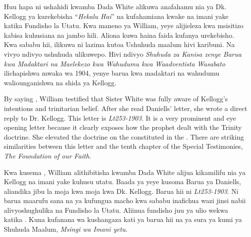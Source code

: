 Huu hapa ni ushahidi kwamba Dada White alikuwa anafahamu nia ya Dk. Kellogg ya kurekebisha “\textit{Hekalu Hai}” na kufahamiana kwake na imani yake katika Fundisho la Utatu. Kwa maneno ya William, yeye alijieleza kwa msisitizo kabisa kuhusiana na jambo hili. Aliona kuwa haina faida kufanya urekebisho. Kwa sababu hii, ilikuwa ni lazima kutoa Ushuhuda maalum hivi karibuni. Na vivyo ndivyo ushuhuda ulikuwepo. Hivi ndivyo \textit{Shuhuda za Kanisa zenye Barua kwa Madaktari na Maelekezo kwa Wahudumu kwa Waadventista Wasabato} ilichapishwa mwaka wa 1904, yenye barua kwa madaktari na wahudumu waliounganishwa na shida ya Kellogg.


By saying , William testified that Sister White was fully aware of Kellogg's intentions and trinitarian belief. After she read Daniells’ letter, she wrote a direct reply to Dr. Kellogg. This letter is \textit{Lt253-1903}. It is a very prominent and eye opening letter because it clearly exposes how the prophet dealt with the Trinity doctrine. She elevated the doctrine on the  constituted in the . There are striking similarities between this letter and the tenth chapter of the Special Testimonies, \textit{The Foundation of our Faith}.


Kwa kusema , William alithibitisha kwamba Dada White alijua kikamilifu nia ya Kellogg na imani yake kuhusu utatu. Baada ya yeye kusoma Barua ya Daniells, aliandika jibu la moja kwa moja kwa Dk. Kellogg. Barua hii ni \textit{Lt253-1903}. Ni barua maarufu sana na ya kufungua macho kwa sababu inafichua wazi jinsi nabii alivyoshughulika na Fundisho la Utatu. Aliinua fundisho juu ya  ulio wekwa katika . Kuna kufanana wa kushangaza kati ya barua hii na ya sura ya kumi ya Shuhuda Maalum, \textit{Msingi wa Imani yetu}.






